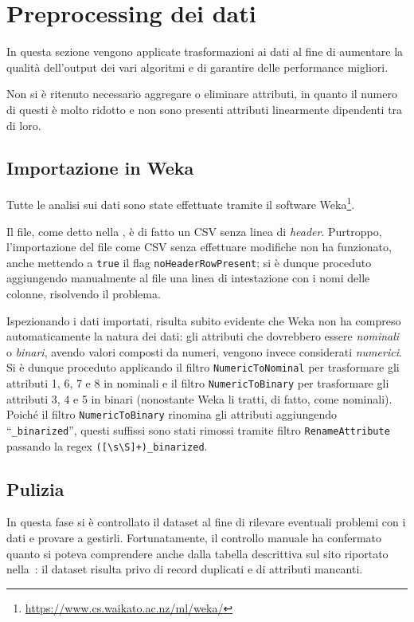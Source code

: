 \section{Preprocessing dei dati}

In questa sezione vengono applicate trasformazioni ai dati al fine di aumentare la qualità dell'output dei vari algoritmi e di garantire delle performance migliori.

Non si è ritenuto necessario aggregare o eliminare attributi, in quanto il numero di questi è molto ridotto e non sono presenti attributi linearmente dipendenti tra di loro.

\subsection{Importazione in Weka}

Tutte le analisi sui dati sono state effettuate tramite il software Weka\footnote{\url{https://www.cs.waikato.ac.nz/ml/weka/}}.

Il file, come detto nella , è di fatto un CSV senza linea di \emph{header}.
Purtroppo, l'importazione del file come CSV senza effettuare modifiche non ha funzionato, anche mettendo a \texttt{true} il flag \texttt{noHeaderRowPresent};
si è dunque proceduto aggiungendo manualmente al file una linea di intestazione con i nomi delle colonne, risolvendo il problema.

Ispezionando i dati importati, risulta subito evidente che Weka non ha compreso automaticamente la natura dei dati:
gli attributi che dovrebbero essere \emph{nominali} o \emph{binari}, avendo valori composti da numeri, vengono invece considerati \emph{numerici}.
Si è dunque proceduto applicando il filtro \texttt{NumericToNominal} per trasformare gli attributi 1, 6, 7 e 8 in nominali
e il filtro \texttt{NumericToBinary} per trasformare gli attributi 3, 4 e 5 in binari (nonostante Weka li tratti, di fatto, come nominali).
Poiché il filtro \texttt{NumericToBinary} rinomina gli attributi aggiungendo ``\texttt{\_binarized}'',
questi suffissi sono stati rimossi tramite filtro \texttt{RenameAttribute} passando la regex \verb|([\s\S]+)_binarized|.

\subsection{Pulizia}

In questa fase si è controllato il dataset al fine di rilevare eventuali problemi con i dati e provare a gestirli.
Fortunatamente, il controllo manuale ha confermato quanto si poteva comprendere anche dalla tabella descrittiva sul sito riportato nella~:
il dataset risulta privo di record duplicati e di attributi mancanti.

